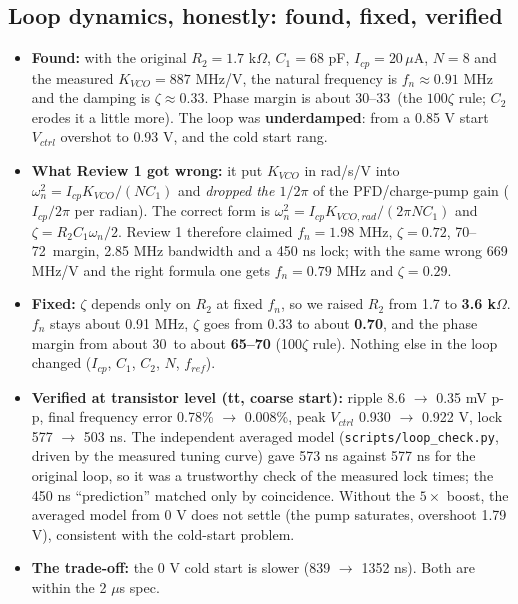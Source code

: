 \documentclass[11pt,a4paper]{article}
\begin{document}
\subsection{Loop dynamics, honestly: found, fixed, verified}
\begin{itemize}
\item \textbf{Found:} with the original $R_2=1.7$ k$\Omega$, $C_1=68$ pF, $I_{cp}=20\,\mu$A, $N=8$ and the measured $K_{VCO}=887$ MHz/V, the natural frequency is $f_n\approx0.91$ MHz and the damping is $\zeta\approx0.33$. Phase margin is about 30--33\textdegree\ (the $100\zeta$ rule; $C_2$ erodes it a little more). The loop was \textbf{underdamped}: from a 0.85 V start $V_{ctrl}$ overshot to 0.93 V, and the cold start rang.
\item \textbf{What Review 1 got wrong:} it put $K_{VCO}$ in rad/s/V into $\omega_n^2=I_{cp}K_{VCO}/(NC_1)$ and \emph{dropped the $1/2\pi$} of the PFD/charge-pump gain ($I_{cp}/2\pi$ per radian). The correct form is $\omega_n^2=I_{cp}K_{VCO,rad}/(2\pi NC_1)$ and $\zeta=R_2C_1\omega_n/2$. Review 1 therefore claimed $f_n=1.98$ MHz, $\zeta=0.72$, 70--72\textdegree\ margin, 2.85 MHz bandwidth and a 450 ns lock; with the same wrong 669 MHz/V and the right formula one gets $f_n=0.79$ MHz and $\zeta=0.29$.
\item \textbf{Fixed:} $\zeta$ depends only on $R_2$ at fixed $f_n$, so we raised $R_2$ from 1.7 to \textbf{3.6 k$\Omega$}. $f_n$ stays about 0.91 MHz, $\zeta$ goes from 0.33 to about \textbf{0.70}, and the phase margin from about 30\textdegree\ to about \textbf{65--70\textdegree} (100$\zeta$ rule). Nothing else in the loop changed ($I_{cp}$, $C_1$, $C_2$, $N$, $f_{ref}$).
\item \textbf{Verified at transistor level (tt, coarse start):} ripple 8.6 $\to$ 0.35 mV p-p, final frequency error 0.78\% $\to$ 0.008\%, peak $V_{ctrl}$ 0.930 $\to$ 0.922 V, lock 577 $\to$ 503 ns. The independent averaged model (\texttt{scripts/}\allowbreak\texttt{loop\_check.py}, driven by the measured tuning curve) gave 573 ns against 577 ns for the original loop, so it was a trustworthy check of the measured lock times; the 450 ns ``prediction'' matched only by coincidence. Without the $5\times$ boost, the averaged model from 0 V does not settle (the pump saturates, overshoot 1.79 V), consistent with the cold-start problem.
\item \textbf{The trade-off:} the 0 V cold start is slower (839 $\to$ 1352 ns). Both are within the 2 $\mu$s spec.
\end{itemize}
\end{document}
